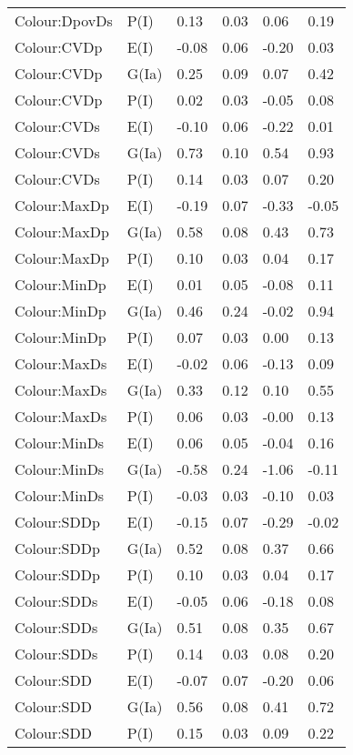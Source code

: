 \begin{center}
\begin{longtable}{|p{1.1in}|p{0.7in}|p{0.7in}|p{0.6in}|p{0.6in}|p{0.6in}|}
  Colour:DpovDs & P(I) & 0.13 & 0.03 & 0.06 & 0.19 \\ 
  Colour:CVDp & E(I) & -0.08 & 0.06 & -0.20 & 0.03 \\ 
  Colour:CVDp & G(Ia) & 0.25 & 0.09 & 0.07 & 0.42 \\ 
  Colour:CVDp & P(I) & 0.02 & 0.03 & -0.05 & 0.08 \\ 
  Colour:CVDs & E(I) & -0.10 & 0.06 & -0.22 & 0.01 \\ 
  Colour:CVDs & G(Ia) & 0.73 & 0.10 & 0.54 & 0.93 \\ 
  Colour:CVDs & P(I) & 0.14 & 0.03 & 0.07 & 0.20 \\ 
  Colour:MaxDp & E(I) & -0.19 & 0.07 & -0.33 & -0.05 \\ 
  Colour:MaxDp & G(Ia) & 0.58 & 0.08 & 0.43 & 0.73 \\ 
  Colour:MaxDp & P(I) & 0.10 & 0.03 & 0.04 & 0.17 \\ 
  Colour:MinDp & E(I) & 0.01 & 0.05 & -0.08 & 0.11 \\ 
  Colour:MinDp & G(Ia) & 0.46 & 0.24 & -0.02 & 0.94 \\ 
  Colour:MinDp & P(I) & 0.07 & 0.03 & 0.00 & 0.13 \\ 
  Colour:MaxDs & E(I) & -0.02 & 0.06 & -0.13 & 0.09 \\ 
  Colour:MaxDs & G(Ia) & 0.33 & 0.12 & 0.10 & 0.55 \\ 
  Colour:MaxDs & P(I) & 0.06 & 0.03 & -0.00 & 0.13 \\ 
  Colour:MinDs & E(I) & 0.06 & 0.05 & -0.04 & 0.16 \\ 
  Colour:MinDs & G(Ia) & -0.58 & 0.24 & -1.06 & -0.11 \\ 
  Colour:MinDs & P(I) & -0.03 & 0.03 & -0.10 & 0.03 \\ 
  Colour:SDDp & E(I) & -0.15 & 0.07 & -0.29 & -0.02 \\ 
  Colour:SDDp & G(Ia) & 0.52 & 0.08 & 0.37 & 0.66 \\ 
  Colour:SDDp & P(I) & 0.10 & 0.03 & 0.04 & 0.17 \\ 
  Colour:SDDs & E(I) & -0.05 & 0.06 & -0.18 & 0.08 \\ 
  Colour:SDDs & G(Ia) & 0.51 & 0.08 & 0.35 & 0.67 \\ 
  Colour:SDDs & P(I) & 0.14 & 0.03 & 0.08 & 0.20 \\ 
  Colour:SDD & E(I) & -0.07 & 0.07 & -0.20 & 0.06 \\ 
  Colour:SDD & G(Ia) & 0.56 & 0.08 & 0.41 & 0.72 \\ 
  Colour:SDD & P(I) & 0.15 & 0.03 & 0.09 & 0.22 \\ 

\end{longtable}
\end{center}
